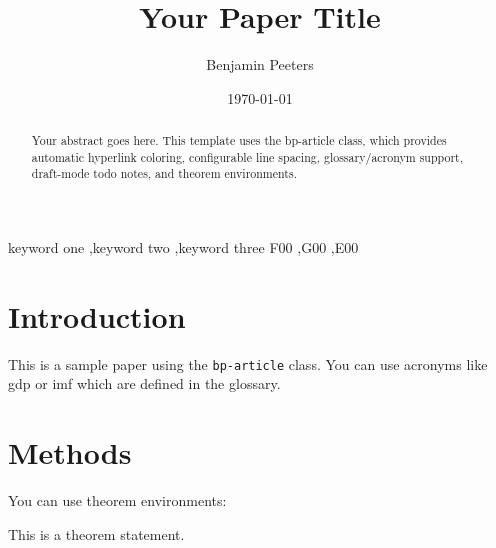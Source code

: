 \documentclass[12pt, colorlinks, doublespace]{bp-article}
\begin{document}

\title{Your Paper Title}
\author[1]{Benjamin Peeters}
\date{\today}

\begin{abstract}
Your abstract goes here. This template uses the bp-article class, which provides
automatic hyperlink coloring, configurable line spacing, glossary/acronym
support, draft-mode todo notes, and theorem environments.
\end{abstract}

\begin{keyword}
keyword one \sep keyword two \sep keyword three
\JEL F00 \sep G00 \sep E00
\end{keyword}

\maketitle


\section{Introduction}

This is a sample paper using the \texttt{bp-article} class. You can use acronyms like \gls{gdp} or \gls{imf} which are defined in the glossary.

\section{Methods}

You can use theorem environments:

\begin{theorem}
This is a theorem statement.
\end{theorem}
\end{document}
